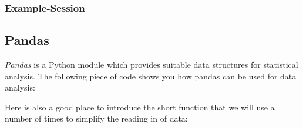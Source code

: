 \subsubsection{Example-Session}

\subsection{Pandas}
\emph{Pandas} is a Python module which provides suitable data structures for
statistical analysis. The following piece of code shows you how pandas can be used for data analysis:



Here is also a good place to introduce the short function that we will use a number of times to simplify the reading in of data:


